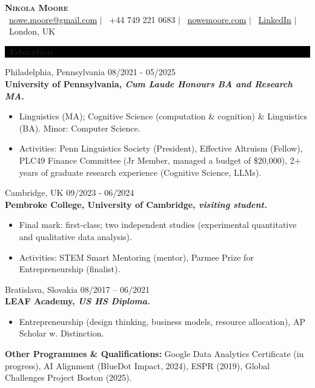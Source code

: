 \documentclass[10pt]{article}
\begin{document}
\begin{center}
   \Large{\textsc{\textbf{Nikola Moore}}}\\
   \normalsize \faEnvelope\ \href{mailto:nowe.moore@gmail.com}{nowe.moore@gmail.com} $\mid$ \faPhone\ +44 749 221 0683 $\mid$ \faLink\ \href{nowemoore.com}{nowemoore.com} $\mid$ \faLinkedin\ \href{https://www.linkedin.com/in/nowemoore/}{LinkedIn} $\mid$ \faMapMarker\ London, UK
\end{center}
\noindent\colorbox{black}{\parbox{\textwidth}{\color{white}\textbf{\faGraduationCap\ Education}}}
Philadelphia, Pennsylvania  \hfill 08/2021 - 05/2025\\
\textbf{University of Pennsylvania, \textit{Cum Laude Honours BA and Research MA}.}
\begin{itemize}[label=$\blacktriangleright$, leftmargin=20pt,
topsep=0pt,
itemsep=0pt]
\item Linguistics (MA); Cognitive Science (computation \& cognition) \& Linguistics (BA). Minor: Computer Science.
\item Activities: Penn Linguistics Society (President), Effective Altruism (Fellow), PLC49 Finance Committee (Jr Member, managed a budget of \$20,000), 2+ years of graduate research experience (Cognitive Science, LLMs).
\end{itemize}
\vspace{0.1in}
Cambridge, UK \hfill									09/2023 - 06/2024\\
\textbf{Pembroke College, University of Cambridge, \textit{visiting student.}}
\begin{itemize}[label=$\blacktriangleright$, leftmargin=20pt,
topsep=0pt,
itemsep=0pt]
\item Final mark: first-class; two independent studies (experimental quantitative and qualitative data analysis).
\item Activities: STEM Smart Mentoring (mentor), Parmee Prize for Entrepreneurship (finalist).
\end{itemize}
\vspace{0.1in}
Bratislava, Slovakia \hfill									08/2017 – 06/2021\\
\textbf{LEAF Academy, \textit{US HS Diploma.}}
\begin{itemize}[label=$\blacktriangleright$, leftmargin=20pt,
topsep=0pt,
itemsep=0pt]
\item	Entrepreneurship (design thinking, business models, resource allocation), AP\textsuperscript{\scriptsize \textregistered} Scholar w. Distinction.
\end{itemize}
\vspace{0.1in}
\textbf{Other Programmes \& Qualifications:} Google Data Analytics Certificate (in progress), AI Alignment (BlueDot Impact, 2024), ESPR (2019), Global Challenges Project Boston (2025).\\
\end{document}
